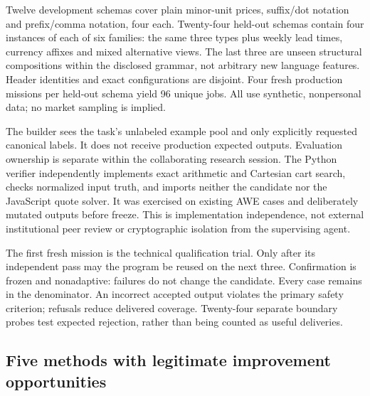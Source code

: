 \documentclass[11pt,letterpaper]{article}
\begin{document}
Twelve development schemas cover plain minor-unit prices, suffix/dot notation and prefix/comma notation, four each. Twenty-four held-out schemas contain four instances of each of six families: the same three types plus weekly lead times, currency affixes and mixed alternative views. The last three are unseen structural compositions within the disclosed grammar, not arbitrary new language features. Header identities and exact configurations are disjoint. Four fresh production missions per held-out schema yield 96 unique jobs. All use synthetic, nonpersonal data; no market sampling is implied.

The builder sees the task's unlabeled example pool and only explicitly requested canonical labels. It does not receive production expected outputs. Evaluation ownership is separate within the collaborating research session. The Python verifier independently implements exact arithmetic and Cartesian cart search, checks normalized input truth, and imports neither the candidate nor the JavaScript quote solver. It was exercised on existing AWE cases and deliberately mutated outputs before freeze. This is implementation independence, not external institutional peer review or cryptographic isolation from the supervising agent.

The first fresh mission is the technical qualification trial. Only after its independent pass may the program be reused on the next three. Confirmation is frozen and nonadaptive: failures do not change the candidate. Every case remains in the denominator. An incorrect accepted output violates the primary safety criterion; refusals reduce delivered coverage. Twenty-four separate boundary probes test expected rejection, rather than being counted as useful deliveries.

\subsection{Five methods with legitimate improvement opportunities}
\end{document}
